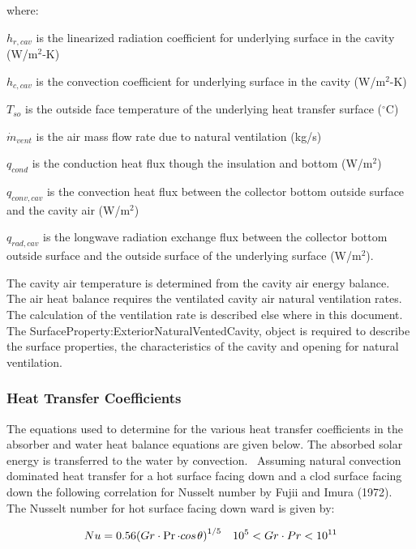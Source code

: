 where:

\(h_{r,cav}\) is the linearized radiation coefficient for underlying surface in the cavity (W/m\(^{2}\)-K)

\(h_{c,cav}\) is the convection coefficient for underlying surface in the cavity (W/m\(^{2}\)-K)

\(T_{so}\) is the outside face temperature of the underlying heat transfer surface (\(^{\circ}\)C)

\({\dot m_{vent}}\) is the air mass flow rate due to natural ventilation (kg/s)

\(q_{cond}\) is the conduction heat flux though the insulation and bottom (W/m\(^{2}\))

\(q_{conv,cav}\) is the convection heat flux between the collector bottom outside surface and the cavity air (W/m\(^{2}\))

\(q_{rad,cav}\) is the longwave radiation exchange flux between the collector bottom outside surface and the outside surface of the underlying surface (W/m\(^{2}\)).

The cavity air temperature is determined from the cavity air energy balance.~ The air heat balance requires the ventilated cavity air natural ventilation rates.~ The calculation of the ventilation rate is described else where in this document. The SurfaceProperty:ExteriorNaturalVentedCavity, object is required to describe the surface properties, the characteristics of the cavity and opening for natural ventilation.

\subsubsection{Heat Transfer Coefficients}\label{heat-transfer-coefficients}

The equations used to determine for the various heat transfer coefficients in the absorber and water heat balance equations are given below. The absorbed solar energy is transferred to the water by convection.~ Assuming natural convection dominated heat transfer for a hot surface facing down and a clod surface facing down the following correlation for Nusselt number by Fujii and Imura (1972).~ The Nusselt number for hot surface facing down ward is given by:

\begin{equation}
Nu = 0.56{\left( {Gr \cdot \Pr  \cdot cos{\kern 1pt} \theta } \right)^{1/5}}\quad {10^5} < Gr \cdot Pr < {10^{11}}
\end{equation}

